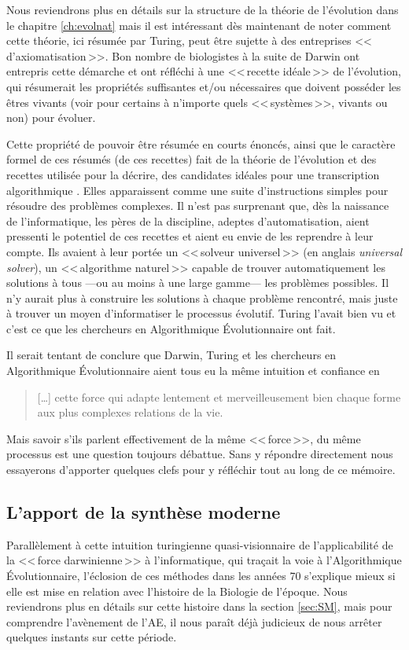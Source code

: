 Nous reviendrons plus en détails sur la structure de la théorie de l'évolution dans le chapitre \ref{ch:evolnat} mais il est intéressant dès maintenant de noter comment cette théorie, ici résumée par Turing, peut être sujette à des entreprises <<\,d'axiomatisation\,>>. Bon nombre de biologistes à la suite de Darwin ont entrepris cette démarche et ont réfléchi à une <<\,recette idéale\,>> de l'évolution, qui résumerait les propriétés suffisantes et/ou nécessaires que doivent posséder les êtres vivants (voir pour certains à n'importe quels <<\,systèmes\,>>, vivants ou non) pour évoluer.

Cette propriété de pouvoir être résumée en courts énoncés, ainsi que le caractère formel de ces résumés (de ces recettes) fait de la théorie de l'évolution et des recettes utilisée pour la décrire, des candidates idéales pour une transcription algorithmique \citep[ch.~4, p.~48]{dennett95darwinsdangerousideaevolutionmeaningslife}. Elles apparaissent comme une suite d'instructions simples pour résoudre des problèmes complexes. Il n'est pas surprenant que, dès la naissance de l'informatique, les pères de la discipline, adeptes d'automatisation, aient pressenti le potentiel de ces recettes et aient eu envie de les reprendre à leur compte. Ils avaient à leur portée un <<\,solveur universel\,>> (en anglais \emph{universal solver}), un <<\,algorithme naturel\,>> capable de trouver automatiquement les solutions à tous ---ou au moins à une large gamme--- les problèmes possibles. Il n'y aurait plus à construire les solutions à chaque problème rencontré, mais juste à trouver un moyen d'informatiser le processus évolutif. Turing l'avait bien vu et c'est ce que les chercheurs en Algorithmique Évolutionnaire ont fait.  

Il serait tentant de conclure que Darwin, Turing et les chercheurs en Algorithmique Évolutionnaire aient tous eu la même intuition et confiance en  
\begin{quote}
   [\ldots] cette force qui adapte lentement et merveilleusement bien chaque forme aux plus complexes relations de la vie.\\
   \citep[ch. 15]{darwin1859originspeciesbymeansnaturalselectionorpreservationfavouredracesstrugglelife}
\end{quote}
Mais savoir s'ils parlent effectivement de la même <<\,force\,>>, du même processus est une question toujours débattue. Sans y répondre directement nous essayerons d'apporter quelques clefs pour y réfléchir tout au long de ce mémoire.

\subsection*{L'apport de la synthèse moderne}
Parallèlement à cette intuition turingienne quasi-visionnaire de l'applicabilité de la <<\,force darwinienne\,>> à l'informatique, qui traçait la voie à l'Algorithmique \'Evolutionnaire, l'éclosion de ces méthodes dans les années 70 s'explique mieux si elle est mise en relation avec l'histoire de la Biologie de l'époque. Nous reviendrons plus en détails sur cette histoire dans la section \ref{sec:SM}, mais pour comprendre l'avènement de l'AE, il nous paraît déjà judicieux de nous arrêter quelques instants sur cette période.

